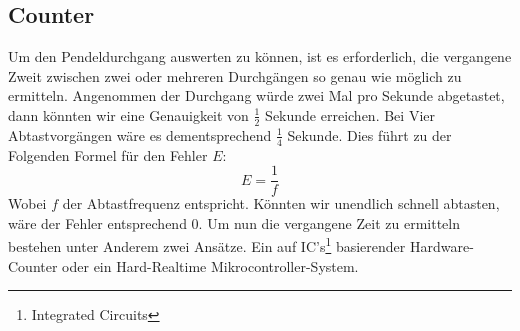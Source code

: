 \subsection{Counter}
	Um den Pendeldurchgang auswerten zu können, ist es erforderlich, die vergangene Zweit zwischen zwei oder mehreren Durchgängen so genau wie möglich zu ermitteln. Angenommen der Durchgang würde zwei Mal pro Sekunde abgetastet, dann könnten wir eine Genauigkeit von $\frac{1}{2}$ Sekunde erreichen. Bei Vier Abtastvorgängen wäre es dementsprechend $\frac{1}{4}$ Sekunde. Dies führt zu der Folgenden Formel für den Fehler $E$:
	\[
		E = \frac{1}{f}
	\]
	Wobei $f$ der Abtastfrequenz entspricht. Könnten wir unendlich schnell abtasten, wäre der Fehler entsprechend 0. Um nun die vergangene Zeit zu ermitteln bestehen unter Anderem zwei Ansätze. Ein auf IC's\footnote{Integrated Circuits} basierender Hardware-Counter oder ein Hard-Realtime Mikrocontroller-System.
